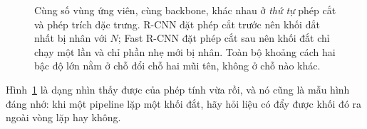 \documentclass[../../../deep_learning.tex]{subfiles}
\begin{document}
\begin{itemize}
\begin{figure}[H]
{}
\caption{Cùng số vùng ứng viên, cùng backbone, khác nhau ở \emph{thứ tự} phép cắt và phép trích đặc trưng. R-CNN đặt phép cắt trước nên khối đắt nhất bị nhân với \(N\); Fast R-CNN đặt phép cắt sau nên khối đắt chỉ chạy một lần và chỉ phần nhẹ mới bị nhân. Toàn bộ khoảng cách hai bậc độ lớn nằm ở chỗ đổi chỗ hai mũi tên, không ở chỗ nào khác.}
\label{fig:rcnn-vs-fast}
\end{figure}

Hình~\ref{fig:rcnn-vs-fast} là dạng nhìn thấy được của phép tính vừa rồi, và nó cũng là mẫu hình đáng nhớ: khi một pipeline lặp một khối đắt, hãy hỏi liệu có đẩy được khối đó ra ngoài vòng lặp hay không.


\end{itemize}
\end{document}
